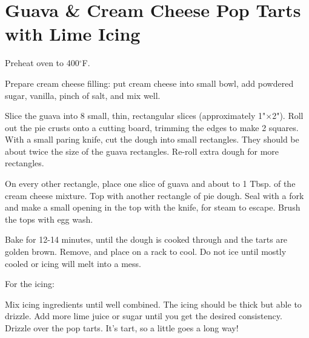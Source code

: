 \section{Guava \& Cream Cheese Pop Tarts with Lime Icing}
\begin{recipe}
	
	
	
	Preheat oven to 400$^{\circ}$F.
	
	Prepare cream cheese filling: put cream cheese into small bowl, add powdered sugar, vanilla, pinch of salt, and mix well.
	
	Slice the guava into 8 small, thin, rectangular slices (approximately 1"$\times$2"). Roll out the pie crusts onto a cutting board, trimming the edges to make 2 squares. With a small paring knife, cut the dough into small rectangles. They should be about twice the size of the guava rectangles. Re-roll extra dough for more rectangles.
	
	On every other rectangle, place one slice of guava and about  to 1 Tbsp. of the cream cheese mixture. Top with another rectangle of pie dough. Seal with a fork and make a small opening in the top with the knife, for steam to escape. Brush the tops with egg wash.
	
	Bake for 12-14 minutes, until the dough is cooked through and the tarts are golden brown. Remove, and place on a rack to cool. Do not ice until mostly cooled or icing will melt into a mess.
		
	For the icing:
	

	Mix icing ingredients until well combined. The icing should be thick but able to drizzle. Add more lime juice or sugar until you get the desired consistency. Drizzle over the pop tarts. It's tart, so a little goes a long way!
	
	
	
\end{recipe}
